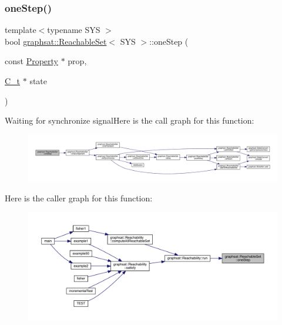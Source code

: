 \subsubsection{\texorpdfstring{oneStep()}{oneStep()}}
{\footnotesize\ttfamily template$<$typename S\+YS $>$ \\
bool \mbox{\hyperlink{classgraphsat_1_1_reachable_set}{graphsat\+::\+Reachable\+Set}}$<$ S\+YS $>$\+::one\+Step (\begin{DoxyParamCaption}\item[{const \mbox{\hyperlink{classgraphsat_1_1_property}{Property}} $\ast$}]{prop,  }\item[{\mbox{\hyperlink{classgraphsat_1_1_reachable_set_a0b7981a216ec4c46be913e08d5f0cd07}{C\+\_\+t}} $\ast$}]{state }\end{DoxyParamCaption})\hspace{0.3cm}{\ttfamily [inline]}}

Waiting for synchronize signalHere is the call graph for this function\+:
\nopagebreak
\begin{figure}[H]
\begin{center}
\leavevmode
\includegraphics[width=350pt]{classgraphsat_1_1_reachable_set_a243adff5738fe2f0c6b736c25c1e3420_cgraph}
\end{center}
\end{figure}
Here is the caller graph for this function\+:
\nopagebreak
\begin{figure}[H]
\begin{center}
\leavevmode
\includegraphics[width=350pt]{classgraphsat_1_1_reachable_set_a243adff5738fe2f0c6b736c25c1e3420_icgraph}
\end{center}
\end{figure}
\mbox{\label{classgraphsat_1_1_reachable_set_ab581b9cb0429661ff08af533b8990ee2}} 
